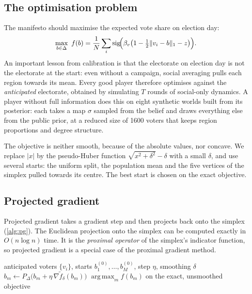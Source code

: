 \documentclass[11pt,a4paper,oneside]{report}
\newcommand{\simplex}{\Delta}
\newcommand{\sig}{\operatorname{sig}}
\DeclareMathOperator*{\argmax}{arg\,max}
\begin{document}
\subsection{The optimisation problem}

The manifesto should maximise the expected vote share on election day:
\begin{equation}\label{eq:manifesto}
  \max_{b \in \simplex}\ f(b) = \frac{1}{N}\sum_{i} \sig\!\Bigl(\beta_v\bigl(1 - \tfrac12\lVert v_i - b\rVert_1
  - z\bigr)\Bigr).
\end{equation}
An important lesson from calibration is that the electorate on election day is not the electorate at the
start: even without a campaign, social averaging pulls each region towards its mean. Every good player
therefore optimises against the \emph{anticipated} electorate, obtained by simulating $T$ rounds of
social-only dynamics. A player without full information does this on eight synthetic worlds built from its
posterior: each takes a map $\sigma$ sampled from the belief and draws everything else from the public
prior, at a reduced size of 1600 voters that keeps region proportions and degree structure.

The objective is neither smooth, because of the absolute values, nor concave. We replace $|x|$ by the
pseudo-Huber function $\sqrt{x^2+\delta^2}-\delta$ with a small $\delta$, and use several starts: the
uniform split, the population mean and the five vertices of the simplex pulled towards its centre. The best
start is chosen on the exact objective.

\subsection{Projected gradient}

Projected gradient takes a gradient step and then projects back onto the simplex (\cref{alg:pg}). The
Euclidean projection onto the simplex can be computed exactly in $O(n\log n)$ time. It is
the \emph{proximal operator} of the simplex's indicator function, so projected gradient is a special case
of the proximal gradient method.

\begin{algorithm}[t]
\caption{Multi-start projected gradient for the manifesto}\label{alg:pg}
\begin{algorithmic}[1]
\Require anticipated voters $\{v_i\}$, starts $b^{(0)}_1,\dots,b^{(0)}_M$, step $\eta$, smoothing $\delta$
  \Repeat
    \State $b_m \gets P_{\simplex}\bigl(b_m + \eta\,\nabla \tilde f_\delta(b_m)\bigr)$
           \Comment{$P_\simplex$: sort, threshold, clip}
\EndFor
\State \Return $\argmax_m f(b_m)$ on the exact, unsmoothed objective
\end{algorithmic}
\end{algorithm}
\end{document}
